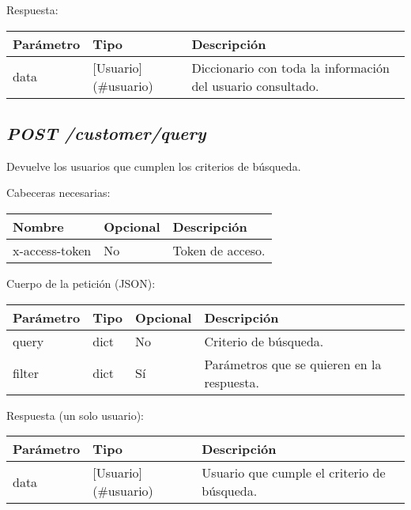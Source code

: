 Respuesta:
\begin{table}[h!]
	\centering
	\begin{adjustbox}{max width=\textwidth}
	\begin{tabular}{|l|l|l|}
		\hline
		Parámetro & Tipo & Descripción \\ \hline
		data & [Usuario](\#usuario) & Diccionario con toda la información del usuario consultado. \\ \hline
	\end{tabular}
\end{adjustbox}
\end{table}



\subsection{\textit{POST /customer/query}}
Devuelve los usuarios que cumplen los criterios de búsqueda.

Cabeceras necesarias:
\begin{table}[h!]
	\centering
	\begin{adjustbox}{max width=\textwidth}
	\begin{tabular}{|l|l|l|}
		\hline
		Nombre & Opcional & Descripción \\ \hline
		x-access-token & No & Token de acceso. \\ \hline
	\end{tabular}
\end{adjustbox}
\end{table}


Cuerpo de la petición (JSON):
\begin{table}[h!]
	\centering
	\begin{adjustbox}{max width=\textwidth}
	\begin{tabular}{|l|l|l|l|}
		\hline
		Parámetro & Tipo & Opcional & Descripción \\ \hline
		query & dict & No & Criterio de búsqueda. \\ \hline
		filter & dict & Sí & Parámetros que se quieren en la respuesta. \\ \hline
	\end{tabular}
\end{adjustbox}
\end{table}

Respuesta (un solo usuario):
\begin{table}[h!]
	\centering
	\begin{adjustbox}{max width=\textwidth}
	\begin{tabular}{|l|l|l|}
		\hline
		Parámetro & Tipo & Descripción \\ \hline
		data & [Usuario](\#usuario) & Usuario que cumple el criterio de búsqueda. \\ \hline
	\end{tabular}
\end{adjustbox}
\end{table}


